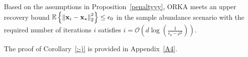 \documentclass[12pt,draftcls,onecolumn]{IEEEtran}
\begin{document}
\begin{corollary}
\label{:-)}
Based on the assumptions in Proposition~\ref{penaltyyy}, ORKA meets an upper recovery bound $\mathbb{E}\left\{\left\|\mathbf{x}_{i}-\mathbf{x}_{\star}\right\|^2_2\right\}\leq \epsilon_0$ in the sample abundance scenario with the required number of iterations $i$ satisfies $i=\mathcal{O}\left(d\log\left(\frac{1}{\epsilon_0-\rho^2}\right)\right)$.

\end{corollary}
The proof of Corollary~\ref{:-)} is provided in Appendix~\ref{A4}.
\end{document}
